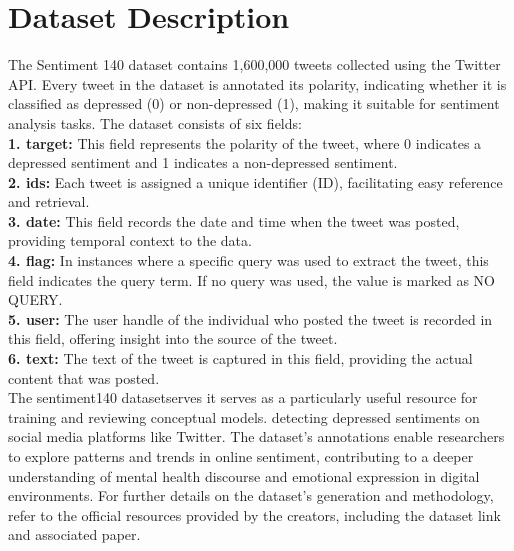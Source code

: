 \section {Dataset Description}
The Sentiment 140 dataset contains 1,600,000 tweets collected using the Twitter API. Every tweet in the dataset is annotated its polarity, indicating whether it is classified as depressed (0) or non-depressed (1), making it suitable for sentiment analysis tasks. The dataset consists of six fields:
\\
\textbf{1. target:} This field represents the polarity of the tweet, where 0 indicates a depressed sentiment and 1 indicates a non-depressed sentiment.
\\
\textbf{2. ids:} Each tweet is assigned a unique identifier (ID), facilitating easy reference and retrieval.
\\
\textbf{3. date:} This field records the date and time when the tweet was posted, providing temporal context to the data.
\\
\textbf{4. flag:} In instances where a specific query was used to extract the tweet, this field indicates the query term. If no query was used, the value is marked as NO QUERY.
\\
\textbf{5. user:} The user handle of the individual who posted the tweet is recorded in this field, offering insight into the source of the tweet.
\\
\textbf{6. text:} The text of the tweet is captured in this field, providing the actual content that was posted.
\\
The sentiment140 dataset\cite{paullada2021data}serves it serves as a particularly useful resource for training and reviewing conceptual models. detecting depressed sentiments on social media platforms like Twitter. The dataset's annotations enable researchers to explore patterns and trends in online sentiment, contributing to a deeper understanding of mental health discourse and emotional expression in digital environments. For further details on the dataset's generation and methodology, refer to the official resources provided by the creators, including the dataset link and associated paper.
